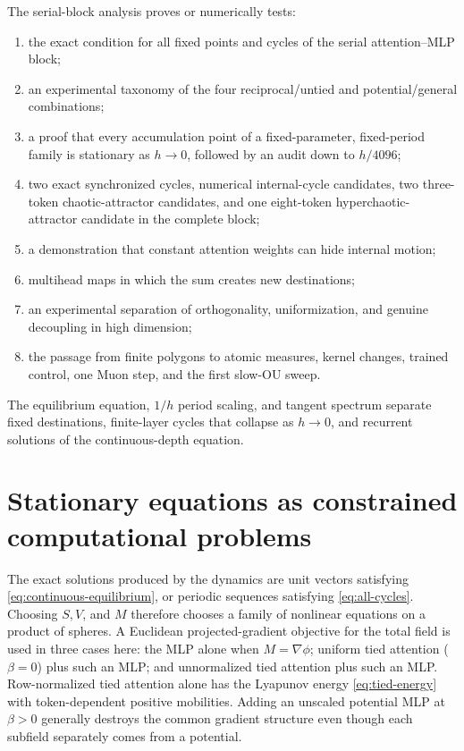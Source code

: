 \documentclass[11pt,a4paper]{article}
\theoremstyle{definition}
\begin{document}
The serial-block analysis proves or numerically tests:
\begin{enumerate}
  \item the exact condition for all fixed points and cycles of the serial
  attention--MLP block;
  \item an experimental taxonomy of the four reciprocal/untied and potential/general
  combinations;
  \item a proof that every accumulation point of a fixed-parameter, fixed-period
  family is stationary as $h\to0$, followed by an audit down to $h/4096$;
  \item two exact synchronized cycles, numerical internal-cycle candidates, two
  three-token chaotic-attractor candidates, and one eight-token hyperchaotic-attractor
  candidate in the complete block;
  \item a demonstration that constant attention weights can hide internal motion;
  \item multihead maps in which the sum creates new destinations;
  \item an experimental separation of orthogonality, uniformization, and genuine
  decoupling in high dimension;
  \item the passage from finite polygons to atomic measures, kernel changes, trained
  control, one Muon step, and the first slow-OU sweep.
\end{enumerate}

The equilibrium equation, $1/h$ period scaling, and tangent spectrum separate fixed
destinations, finite-layer cycles that collapse as $h\to0$, and recurrent solutions
of the continuous-depth equation.

\section{Stationary equations as constrained computational problems}
\label{sec:problems}

The exact solutions produced by the dynamics are unit vectors satisfying
\eqref{eq:continuous-equilibrium}, or periodic sequences satisfying
\eqref{eq:all-cycles}. Choosing $S,V$, and $M$ therefore chooses a family of nonlinear
equations on a product of spheres.  A Euclidean projected-gradient objective for the
total field is used in three cases here: the MLP alone when $M=\nabla\phi$; uniform
tied attention ($\beta=0$) plus such an MLP; and unnormalized tied attention plus such
an MLP.  Row-normalized tied attention alone has the Lyapunov energy
\eqref{eq:tied-energy} with token-dependent positive mobilities.  Adding an unscaled
potential MLP at $\beta>0$ generally destroys the common gradient structure even
though each subfield separately comes from a potential.
\end{document}
